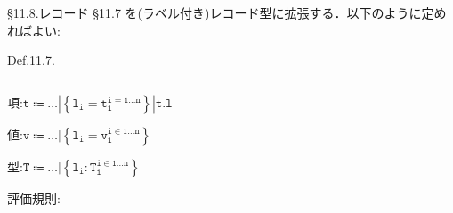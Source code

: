 \documentclass[9pt]{beamer}
\begin{document}
\begin{frame}{\S11.8.レコード}
\S11.7 を(ラベル付き)レコード型に拡張する．以下のように定めればよい:
\begin{alertblock}{Def.11.7.}
    \begin{columns}
    \begin{column}{0.3\columnwidth}
        項:$\mathtt{t\Coloneq\ldots|\left\{l_{i} = t_{i}^{i = 1\ldots n}\right\}|t.l}$
        
        値:$\mathtt{v\Coloneq\ldots|\left\{l_{i} = v_{i}^{i\in 1\ldots n}\right\}}$

        型:$\mathtt{T\Coloneq\ldots|\left\{l_{i}:T_{i}^{i\in 1\ldots n}\right\}}$

        評価規則:
        \begin{prooftree}
        \end{prooftree}
    \end{column}
    \begin{column}{0.7\columnwidth}
        \begin{prooftree}
            \end{prooftree}
    \begin{prooftree}
    \end{prooftree}
    \begin{prooftree}
    \end{prooftree}
    \begin{prooftree}
    \end{prooftree}
    \end{column}
    \end{columns}
\end{alertblock}
\end{frame}
\end{document}
